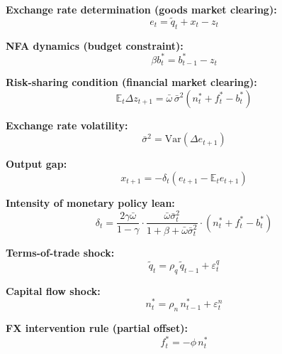 \documentclass[12pt,a4paper]{article}
\begin{document}
\begin{singlespace}

\textbf{Exchange rate determination (goods market clearing):}
\begin{equation}
    e_t = \tilde{q}_t + x_t - z_t
    \label{eq:er}
\end{equation}

\medskip
\textbf{NFA dynamics (budget constraint):}
\begin{equation}
    \beta b^*_t = b^*_{t-1} - z_t
    \label{eq:nfa}
\end{equation}

\medskip
\textbf{Risk-sharing condition (financial market clearing):}
\begin{equation}
    \mathbb{E}_t \Delta z_{t+1} = \bar{\omega}\,\bar{\sigma}^2
    \left(n^*_t + f^*_t - b^*_t\right)
    \label{eq:risksharing}
\end{equation}

\medskip
\textbf{Exchange rate volatility:}
\begin{equation}
    \bar{\sigma}^2 = \text{Var}\left(\Delta e_{t+1}\right)
    \label{eq:sigma}
\end{equation}

\medskip
\textbf{Output gap:}
\begin{equation}
    x_{t+1} = -\delta_t \left(e_{t+1} - \mathbb{E}_t e_{t+1}\right)
    \label{eq:outputgap}
\end{equation}

\medskip
\textbf{Intensity of monetary policy lean:}
\begin{equation}
    \delta_t = \frac{2\gamma\bar{\omega}}{1-\gamma}
    \cdot \frac{\bar{\omega}\bar{\sigma}^2_t}{1 + \beta + \bar{\omega}\bar{\sigma}^2_t}
    \cdot \left(n^*_t + f^*_t - b^*_t\right)
    \label{eq:delta}
\end{equation}

\medskip
\textbf{Terms-of-trade shock:}
\begin{equation}
    \tilde{q}_t = \rho_q\, \tilde{q}_{t-1} + \varepsilon^q_t
    \label{eq:qtilde}
\end{equation}

\medskip
\textbf{Capital flow shock:}
\begin{equation}
    n^*_t = \rho_n\, n^*_{t-1} + \varepsilon^n_t
    \label{eq:nstar}
\end{equation}

\medskip
\textbf{FX intervention rule (partial offset):}
\begin{equation}
    f^*_t = -\phi\, n^*_t
    \label{eq:fxi}
\end{equation}

\end{singlespace}
\end{document}
